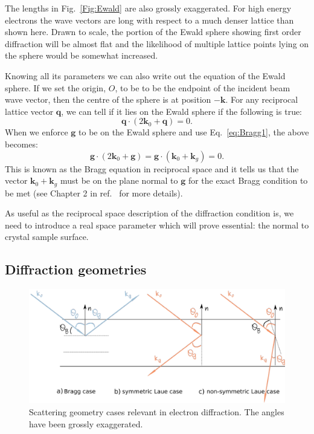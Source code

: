 The lengths in Fig.~\ref{Fig:Ewald} are also grossly exaggerated. For high energy electrons the wave vectors are long with respect to a much denser lattice than shown here. Drawn to scale, the portion of the Ewald sphere showing first order diffraction will be almost flat and the likelihood of multiple lattice points lying on the sphere would be somewhat increased.   



 Knowing all its parameters we can also write out the equation of the Ewald sphere. If we set the origin, $O$, to be to be the endpoint of the incident beam wave vector, then the centre of the sphere is at position $-\mathbf{k}$. For any reciprocal lattice vector $\mathbf{q}$, we can tell if it lies on the Ewald sphere if the following is true:
 \begin{equation*}
     \mathbf{q} \cdot (2 \mathbf{k}_0 + \mathbf{q})=0.
 \end{equation*}
When we enforce $\mathbf{g}$ to be on the Ewald sphere and use Eq.~\ref{eq:Bragg1}, the above becomes:
\begin{equation}
    \label{Eq:recBragg}
    \mathbf{g}\cdot (2 \mathbf{k}_0 + \mathbf{g})=\mathbf{g} \cdot (\mathbf{k}_0 + \mathbf{k}_g)=0.
\end{equation}
 This is known as the Bragg equation in reciprocal space and it tells us that the vector $\mathbf{k}_0 + \mathbf{k}_g$ must be on the plane normal to  $\mathbf{g}$ for the exact Bragg condition to be met (see Chapter 2 in  ref.~\cite{MarcTEM03} for more details). 
 




 




As useful as the reciprocal space description of the diffraction condition is, we need to introduce a real space parameter which will prove essential: the normal to crystal sample surface.

%
\subsection{Diffraction geometries}
\label{sec:diffracGeom}
\begin{figure}[ht]
    \centering
\includegraphics[width=0.92\linewidth]{Figures/BraggvsLaue.png}
\caption[Electron diffraction scattering geometry. ]{Scattering geometry cases relevant in electron diffraction. The angles have been grossly exaggerated. }
\label{Fig:BraggvsLaue}
\end{figure}

